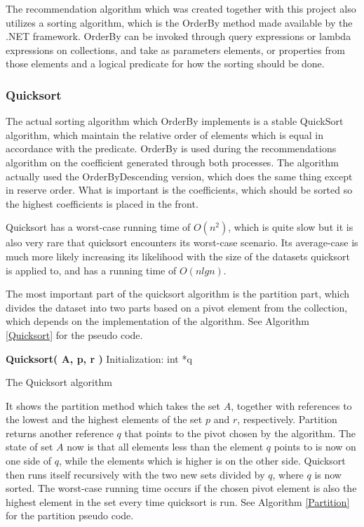 The recommendation algorithm which was created together with this project also utilizes a sorting algorithm, which is the OrderBy method made available by the .NET framework. OrderBy can be invoked through query expressions or lambda expressions on collections, and take as parameters elements, or properties from those elements and a logical predicate for how the sorting should be done. \cite{AlgoAnal1}

\subsubsection{Quicksort}

The actual sorting algorithm which OrderBy implements is a stable QuickSort algorithm, which maintain the relative order of elements which is equal in accordance with the predicate. OrderBy is used during the recommendations algorithm on the coefficient generated through both processes. The algorithm actually used the OrderByDescending version, which does the same thing except in reserve order. What is important is the coefficients, which should be sorted so the highest coefficients is placed in the front.

Quicksort has a worst-case running time of $O(n^2)$, which is quite slow but it is also very rare that quicksort encounters its worst-case scenario. Its average-case is much more likely increasing its likelihood with the size of the datasets quicksort is applied to, and has a running time of $O(nlgn)$.

The most important part of the quicksort algorithm is the partition part, which divides the dataset into two parts based on a pivot element from the collection, which depends on the implementation of the algorithm. See Algorithm \ref{Quicksort} for the pseudo code.

\begin{algorithm}
	\DontPrintSemicolon
	\textbf{Quicksort( A, p, r )}\;
	Initialization:\;
	int *q\;
	\caption{The Quicksort algorithm}
	\label{Quicksort}
\end{algorithm}

It shows the partition method which takes the set $A$, together with references to the lowest and the highest elements of the set $p$ and $r$, respectively. Partition returns another reference $q$ that points to the pivot chosen by the algorithm. The state of set $A$ now is that all elements less than the element $q$ points to is now on one side of $q$, while the elements which is higher is on the other side. Quicksort then runs itself recursively with the two new sets divided by $q$, where $q$ is now sorted. The worst-case running time occurs if the chosen pivot element is also the highest element in the set every time quicksort is run. See Algorithm \ref{Partition} for the partition pseudo code.

